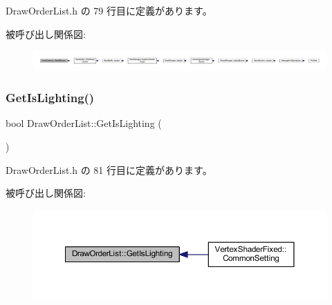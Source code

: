  Draw\+Order\+List.\+h の 79 行目に定義があります。

被呼び出し関係図\+:
\nopagebreak
\begin{figure}[H]
\begin{center}
\leavevmode
\includegraphics[width=350pt]{class_draw_order_list_a265a403c0d87abbcdc71d37a2c4f7b57_icgraph}
\end{center}
\end{figure}
\mbox{\label{class_draw_order_list_abd19fe57bca4132c08a3443044bdf2b9}} 
\subsubsection{\texorpdfstring{Get\+Is\+Lighting()}{GetIsLighting()}}
{\footnotesize\ttfamily bool Draw\+Order\+List\+::\+Get\+Is\+Lighting (\begin{DoxyParamCaption}{ }\end{DoxyParamCaption})\hspace{0.3cm}{\ttfamily [inline]}}



 Draw\+Order\+List.\+h の 81 行目に定義があります。

被呼び出し関係図\+:\nopagebreak
\begin{figure}[H]
\begin{center}
\leavevmode
\includegraphics[width=350pt]{class_draw_order_list_abd19fe57bca4132c08a3443044bdf2b9_icgraph}
\end{center}
\end{figure}
\mbox{\label{class_draw_order_list_a28c14812ea793a3f3d752d58ccb481b2}} 
